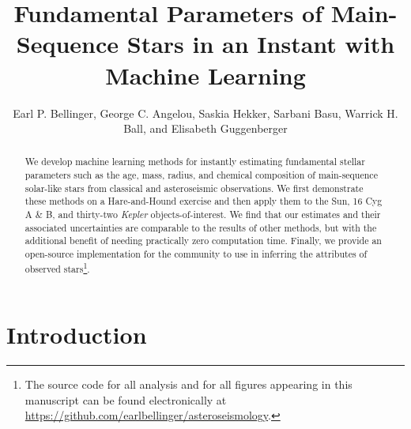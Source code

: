 \documentclass[manuscript]{aastex}
\begin{document}
\title{Fundamental Parameters of Main-Sequence Stars in an Instant with Machine Learning}

\author{Earl P. Bellinger, George C. Angelou, Saskia Hekker, Sarbani Basu, Warrick H. Ball, and Elisabeth Guggenberger}


\begin{abstract}
We develop machine learning methods for instantly estimating fundamental stellar parameters such as the age, mass, radius, and chemical composition of main-sequence solar-like stars from classical and asteroseismic observations. We first demonstrate these methods on a Hare-and-Hound exercise and then apply them to the Sun, 16 Cyg A \& B, and thirty-two \emph{Kepler} objects-of-interest. We find that our estimates and their associated uncertainties are comparable to the results of other methods, but with the additional benefit of needing practically zero computation time. Finally, we provide an open-source implementation for the community to use in inferring the attributes of observed stars\footnote{The source code for all analysis and for all figures appearing in this manuscript can be found electronically at \url{https://github.com/earlbellinger/asteroseismology}.}. 
\end{abstract}




\section{Introduction}
\end{document}
